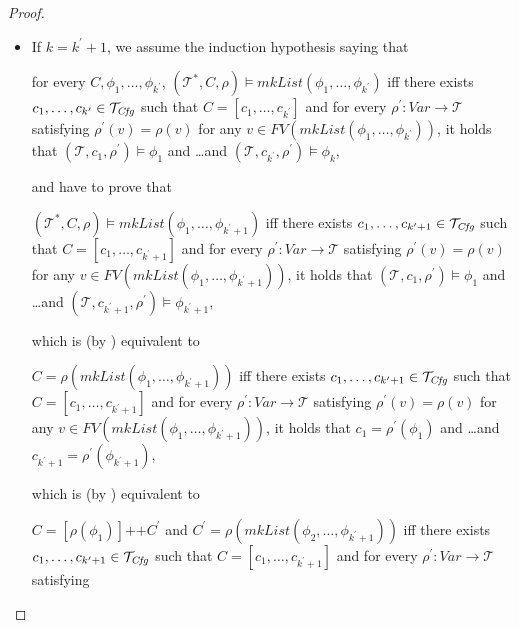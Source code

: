 \begin{proof}
\begin{itemize}
    \item If $k = k^\prime + 1$, we assume the induction hypothesis saying that
    \begin{proofenv}
    for every $C, \phi_1, \ldots, \phi_{k^\prime}$,
    $(\mathcal{T}^*, C, \rho) \vDash \mathit{mkList}(\phi_1,\ldots,\phi_{k^\prime})$
    iff there exists $c_1, \ldots, c_{k^\prime} \in \mathcal{T}_{\mathit{Cfg}}$ such that $C = [c_1, \ldots, c_{k^\prime}]$
    and for every $\rho^\prime : \mathit{Var} \to \mathcal{T}$ satisfying
    $\rho^\prime(v) = \rho(v)$ for any
    $v \in \mathit{FV}(\mathit{mkList}(\phi_1, \ldots, \phi_{k^\prime}))$,
    it holds that
    $(\mathcal{T}, c_1, \rho^\prime) \vDash \phi_1$ and \ldots and $(\mathcal{T}, c_{k^\prime}, \rho^\prime) \vDash \phi_k$,
    \end{proofenv}
    and have to prove that
    \begin{proofenv}
    $(\mathcal{T}^*, C, \rho) \vDash \mathit{mkList}(\phi_1,\ldots,\phi_{k^\prime + 1})$
    iff there exists $c_1, \ldots, c_{k^\prime + 1} \in \mathcal{T}_{\mathit{Cfg}}$ such that $C = [c_1, \ldots, c_{k^\prime + 1}]$ and 
    for every $\rho^\prime : \mathit{Var} \to \mathcal{T}$ satisfying
    $\rho^\prime(v) = \rho(v)$ for any
    $v \in \mathit{FV}(\mathit{mkList}(\phi_1, \ldots, \phi_{k^\prime + 1}))$,
    it holds that
    $(\mathcal{T}, c_1, \rho^\prime) \vDash \phi_1$ and \ldots and $(\mathcal{T}, c_{k^\prime + 1}, \rho^\prime) \vDash \phi_{k^\prime + 1}$,
    \end{proofenv}
    which is (by ) equivalent to
    \begin{proofenv}
    $C = \rho(\mathit{mkList}(\phi_1,\ldots,\phi_{k^\prime + 1}))$
    iff there exists $c_1, \ldots, c_{k^\prime + 1} \in \mathcal{T}_{\mathit{Cfg}}$ such that $C = [c_1, \ldots, c_{k^\prime + 1}]$
    and for every $\rho^\prime : \mathit{Var} \to \mathcal{T}$ satisfying
    $\rho^\prime(v) = \rho(v)$ for any
    $v \in \mathit{FV}(\mathit{mkList}(\phi_1, \ldots, \phi_{k^\prime + 1}))$,
    it holds that
    $c_1 = \rho^\prime(\phi_1)$ and \ldots and $c_{k^\prime + 1} = \rho^\prime(\phi_{k^\prime + 1})$,
    \end{proofenv}
    which is (by ) equivalent to
    \begin{proofenv}
    $C = [\rho(\phi_1)] \texttt{++} C^\prime$ and $C^\prime = \rho(\mathit{mkList}(\phi_2,\ldots,\phi_{k^\prime + 1}))$
    iff there exists $c_1, \ldots, c_{k^\prime + 1} \in \mathcal{T}_{\mathit{Cfg}}$ such that $C = [c_1, \ldots, c_{k^\prime + 1}]$
    and for every $\rho^\prime : \mathit{Var} \to \mathcal{T}$ satisfying

\end{proofenv}
\end{itemize}
\end{proof}
